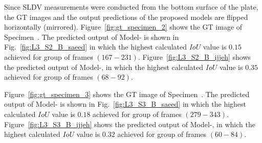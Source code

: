 Since SLDV measurements were conducted from the bottom surface of the plate, the GT images and the output predictions of the proposed models are flipped horizontally (mirrored).
Figure~\ref{fig:gt_specimen_2} shows the GT image of Specimen~.
The predicted output of Model- is shown in Fig.~\ref{fig:L3_S2_B_saeed} in which the highest calculated \(IoU\) value is \(0.15\) achieved for group of frames \((167-231)\).
Figure~\ref{fig:L3_S2_B_ijjeh} shows the predicted output of Model-, in which the highest calculated \(IoU\) value is \(0.35\) achieved for group of frames \((68-92)\).

Figure~\ref{fig:gt_specimen_3} shows the GT image of Specimen~.
The predicted output of Model- is shown in Fig.~\ref{fig:L3_S3_B_saeed} in which the highest calculated \(IoU\) value is \(0.18\) achieved for group of frames \((279-343)\).
Figure~\ref{fig:L3_S3_B_ijjeh} shows the predicted output of Model-, in which the highest calculated \(IoU\) value is \(0.32\) achieved for group of frames \((60-84)\).

